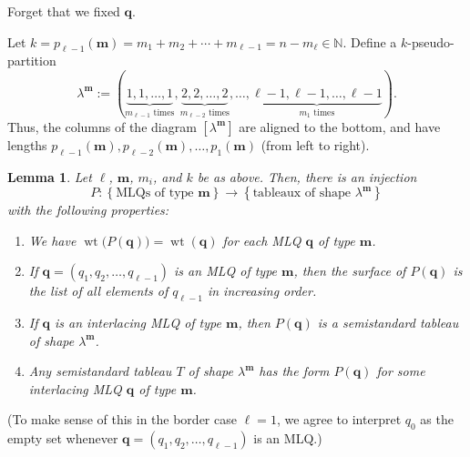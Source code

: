 \documentclass[reqno]{amsart}
\newcommand{\0}{\phantom{c}}
\newcommand{\diag}[1]{\left[#1\right]} %
\DeclareMathOperator{\wt}{wt} %
\newcommand{\mm}{\mathbf{m}}
\newcommand{\qq}{\mathbf{q}}
\newcommand{\NN}{\mathbb{N}}
\newcommand{\set}[1]{\left\{ #1 \right\}}
\newcommand{\tup}[1]{\left( #1 \right)}
\theoremstyle{plain}
\newtheorem{lemma}[thm]{Lemma}
\theoremstyle{definition}
\numberwithin{equation}{section}
\newcommand{\Darij}[1]{\todo[size=\tiny,inline,color=red!30]{#1
      \\ \hfill --- Darij}}
\begin{document}
\Darij{TODO: Example.}

Forget that we fixed $\qq$.

Let $k = p_{\ell-1}(\mm) = m_1 + m_2 + \cdots + m_{\ell-1} = n - m_{\ell} \in \NN$.
Define a $k$-pseudo-partition
\[
\label{eq.determinant_form.interlacing.lam}
\lambda^{\mm} := (
  \underbrace{1,1,\ldots,1}_{m_{\ell-1}\text{ times}},
  \underbrace{2,2,\ldots,2}_{m_{\ell-2}\text{ times}},
  \ldots,
  \underbrace{\ell-1,\ell-1,\ldots,\ell-1}_{m_1\text{ times}}
).
\]
Thus, the columns of the diagram $\diag{\lambda^{\mm}}$ are aligned to the bottom, and have lengths $p_{\ell-1}(\mm), p_{\ell-2}(\mm), \dotsc, p_1(\mm)$ (from left to right).

\begin{lemma}
\label{lem:determinant_form.bij1}
Let $\ell$, $\mm$, $m_i$, and $k$ be as above.
Then, there is an injection
\[
P \colon \set{ \text{MLQs of type } \mm } \to \set{ \text{tableaux of shape } \lambda^{\mm} }
\]
with the following properties:
\begin{enumerate}
\item[(a)] We have $\wt\bigl(  P(\qq) \bigr) = \wt(\qq)$ for each MLQ $\qq$ of type $\mm$.

\item[(b)] If $\qq = \tup{q_1, q_2, \dotsc, q_{\ell-1}}$ is an MLQ of type $\mm$, then the surface of $P(\qq)$ is the list of all elements of $q_{\ell-1}$ in increasing order.

\item[(c)] If $\qq$ is an interlacing MLQ of type $\mm$, then $P(\qq)$ is a semistandard tableau of shape $\lambda^{\mm}$.

\item[(d)] Any semistandard tableau $T$ of shape $\lambda^{\mm}$ has the form $P(\qq)$ for some interlacing MLQ $\qq$ of type $\mm$.
\end{enumerate}
\end{lemma}

(To make sense of this in the border case $\ell = 1$, we agree to interpret $q_0$ as the empty set whenever $\qq = \tup{q_1, q_2, \dotsc, q_{\ell-1}}$ is an MLQ.)
\end{document}
